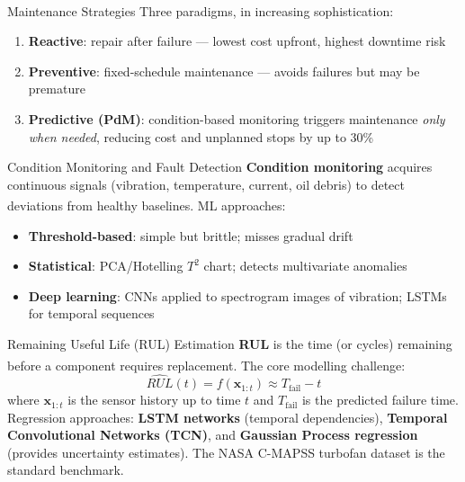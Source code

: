 \begin{v3topic}{Maintenance Strategies}
    Three paradigms, in increasing sophistication\textsuperscript{\cite[][pp.~1--3]{leeSurveyPredictiveMaintenance2019}}:
    \begin{enumerate}
        \item \textbf{Reactive}: repair after failure — lowest cost upfront, highest downtime risk
        \item \textbf{Preventive}: fixed-schedule maintenance — avoids failures but may be premature
        \item \textbf{Predictive (PdM)}: condition-based monitoring triggers maintenance \emph{only when needed}, reducing cost and unplanned stops by up to 30\%
    \end{enumerate}

\end{v3topic}
\begin{v3topic}{Condition Monitoring and Fault Detection}
    \textbf{Condition monitoring} acquires continuous signals (vibration, temperature, current, oil debris) to detect deviations from healthy baselines\textsuperscript{\cite[][pp.~213--215]{zhaoDeepLearningFault2019}}.
    ML approaches:
    \begin{itemize}
        \item \textbf{Threshold-based}: simple but brittle; misses gradual drift
        \item \textbf{Statistical}: PCA/Hotelling $T^2$ chart; detects multivariate anomalies
        \item \textbf{Deep learning}: CNNs applied to spectrogram images of vibration; LSTMs for temporal sequences
    \end{itemize}

\end{v3topic}
\begin{v3topic}{Remaining Useful Life (RUL) Estimation}
    \textbf{RUL} is the time (or cycles) remaining before a component requires replacement\textsuperscript{\cite[][pp.~215--220]{zhaoDeepLearningFault2019}}.
    The core modelling challenge:
    \begin{equation}
        \hat{RUL}(t) = f\!\left(\mathbf{x}_{1:t}\right) \approx T_{\text{fail}} - t
    \end{equation}
    where $\mathbf{x}_{1:t}$ is the sensor history up to time $t$ and $T_{\text{fail}}$ is the predicted failure time.
    Regression approaches: \textbf{LSTM networks} (temporal dependencies), \textbf{Temporal Convolutional Networks (TCN)}, and \textbf{Gaussian Process regression} (provides uncertainty estimates).
    The NASA C-MAPSS turbofan dataset is the standard benchmark.
\end{v3topic}

